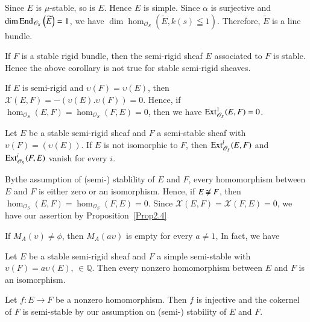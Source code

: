 \begin{Proof}
Since $E$ is $\mu$-stable, so is $E$. Hence $E$ is simple. Since
$\alpha$ is surjective and $\dim
\mathrm{End}_{\mathscr{O}_S}\left(\widetilde{E}\right)=1$, we have
$\dim \hom_{\mathscr{O}_S}\left(\widetilde{E},k(s)\leqq 1\right)$. Therefore,
$\widetilde{E}$ is a line bundle.
\enprf
\end{Proof}

\begin{remark}\label{remark3.11}
If $F$ is a stable rigid bundle, then the semi-rigid sheaf $E$
associated to $F$ is stable. Hence the above corollary is not true for
stable semi-rigid sheaves.

If $E$ is semi-rigid and $\upsilon(F)=\upsilon(E)$, then
$\mathcal{X}(E,F)=-(\upsilon(E).\upsilon(F))=0$. Hence, if
$\hom_{\mathscr{O}_S}(E,F)=\hom_{\mathscr{O}_S}(F,E)=0$, then we have
$\mathrm{Ext}^{1}_{\mathscr{O}_S}\\(E,F)=0$. 
\end{remark}

\begin{Prop}\label{Prop3.12}
Let $E$ be a stable semi-rigid sheaf and $F$ a semi-stable sheaf with
$\upsilon(F)=(\upsilon(E))$. If $E$ is not isomorphic to $F$, then
$\mathrm{Ext}^{i}_{\mathscr{O}_S}(E,F)$ and $\mathrm{Ext}^{i}_{\mathscr{O}_S}(F,E)$
vanish for every $i$. 
\end{Prop}

\begin{Proof}
By\pageoriginale the assumption of (semi-) stablility of $E$ and $F$, every
homomorphism between $E$ and $F$ is either zero or an
isomorphism. Hence, if $E\not\kern-1pt\cong F$, then
$\hom_{\mathscr{O}_S}(E,F)=\hom_{\mathscr{O}_S}(F,E)=0$. Since
$\mathcal{X}(E,F)=\mathcal{X}(F,E)=0$, we have our assertion by
Proposition~\ref{Prop2.4}
\enprf
\end{Proof}

If $M_A(\upsilon) \neq \phi$, then $M_A(a\upsilon)$ is empty for every
$a\neq 1$, In fact, we have 

\begin{Prop}\label{Prop3.13}
Let $E$ be a stable semi-rigid sheaf and $F$ a simple semi-stable with
$\upsilon(F)=a\upsilon(E)$, $\in \mathbb{Q}$. Then every nonzero
homomorphism between $E$ and $F$ is an isomorphism. 
\end{Prop}

\begin{Proof}
Let $f:E\to F$ be a nonzero homomorphism. Then $f$ is injective and
the cokernel of $F$ is semi-stable by our assumption on (semi-)
stability of $E$ and $F$.
\end{Proof}

